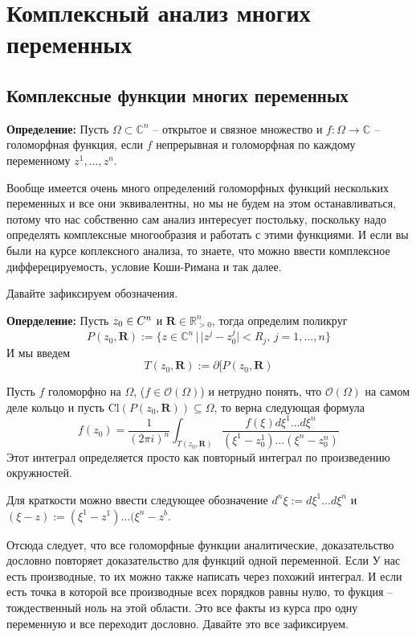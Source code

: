 \chapter{Комплексный анализ многих переменных}
\section{Комплексные функции многих переменных}
\textbf{Определение:} Пусть $\Omega\subset\mathbb C^n$ – открытое и связное
множество и $f:\Omega\rightarrow\mathbb C$ – голоморфная функция, если $f$
непрерывная и голоморфная по каждому переменному $z^1,\ldots,z^n$.

Вообще имеется очень много определений голоморфных функций нескольких переменных
и все они эквивалентны, но мы не будем на этом останавливаться, потому что нас
собственно сам анализ интересует постольку, поскольку надо определять комплексные
многообразия и работать с этими функциями. И если вы были на курсе коплексного
анализа, то знаете, что можно ввести комплексное дифферецируемость, условие
Коши-Римана и так далее.

Давайте зафиксируем обозначения.

\textbf{Оперделение:} Пусть $z_0\in\mathbb\mathbb C^n$ и $\mathbf R\in\mathbb R^n_{>0}$,
тогда определим поликруг
\[P(z_0,\mathbf R):=\{z\in\mathbb C^n\,|\,|z^j-z^j_0|<R_j,\,j=1,\ldots,n\}\]
И мы введем
\[T(z_0,\mathbf R):=\partial [P(z_0,\mathbf R)\]

\utv Пусть $f$ голоморфно на $\Omega$, ($f\in\mathcal O(\Omega)$) и нетрудно понять,
что $\mathcal O(\Omega)$ на самом деле кольцо и пусть $\text{Cl}(P(z_0,\mathbf R))\subseteq\Omega$, то верна
следующая формула
\[f(z_0)=\frac{1}{(2\pi i)^n}\int_{T(z_0,\mathbf R)}\frac{f(\xi)d\xi^1\ldots d\xi^n}{(\xi^1-z^1_0)\ldots(\xi^n-z^n_0)}\]
Этот интеграл определяется просто как повторный интеграл по произведению окружностей.

Для краткости можно ввести следующее обозначение $d^n\xi:=d\xi^1\ldots d\xi^n$ и
$(\xi-z):=(\xi^1-z^1)\ldots(\xi^n-z^b$.

Отсюда следует, что все голоморфные функции аналитические, доказательство
дословно повторяет доказательство для функций одной переменной. Если У нас
есть производные, то их можно также написать через похожий интеграл. И если
есть точка в которой все производные всех порядков равны нулю, то фукция –
тождественный ноль на этой области. Это все факты из курса про одну переменную
и все переходит дословно. Давайте это все зафиксируем.

